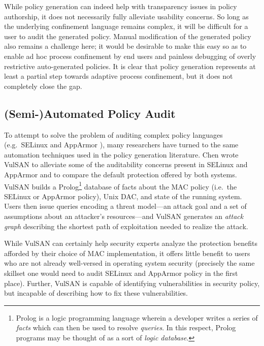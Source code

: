 \documentclass[dvipsnames, 12pt]{article}
\begin{document}
While policy generation can indeed help with transparency issues in policy
authorship, it does not necessarily fully alleviate usability concerns. So long
as the underlying confinement language remains complex, it will be difficult for
a user to audit the generated policy. Manual modification of the generated
policy also remains a challenge here; it would be desirable to make this easy so
as to enable ad hoc process confinement by end users and painless debugging of
overly restrictive auto-generated policies. It is clear that policy generation
represents at least a partial step towards adaptive process confinement, but it
does not completely close the gap.

\subsection{(Semi-)Automated Policy Audit}

To attempt to solve the problem of auditing complex policy languages
(e.g.~SELinux \cite{smalley2001_selinux} and AppArmor
\cite{cowan2000_apparmor}), many researchers have turned to the same automation
techniques used in the policy generation literature. Chen \etal wrote VulSAN
\cite{chen09_vulsan} to alleviate some of the auditability concerns present in
SELinux and AppArmor and to compare the default protection offered by both
systems. VulSAN builds a Prolog\footnote{Prolog is a logic programming language
wherein a developer writes a series of \textit{facts} which can then be used to
resolve \textit{queries}. In this respect, Prolog programs may be thought of as
a sort of \textit{logic database}.} database of facts about the MAC policy
(i.e.~the SELinux or AppArmor policy), Unix DAC, and state of the running
system. Users then issue queries encoding a threat model---an attack goal and
a set of assumptions about an attacker's resources---and VulSAN generates an
\textit{attack graph} describing the shortest path of exploitation needed to
realize the attack.

While VulSAN can certainly help security experts analyze
the protection benefits afforded by their choice of MAC implementation, it offers
little benefit to users who are not already well-versed in operating system security
(precisely the same skillset one would need to audit SELinux and AppArmor policy
in the first place). Further, VulSAN is capable of identifying vulnerabilities in
security policy, but incapable of describing how to fix these vulnerabilities.
\end{document}
